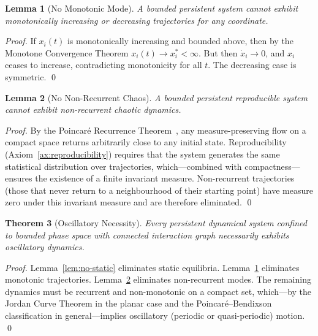 \documentclass[11pt,twocolumn,a4paper]{article}
\newtheorem{theorem}{Theorem}[section]
\newtheorem{lemma}[theorem]{Lemma}
\begin{document}
\begin{lemma}[No Monotonic Mode]
\label{lem:no-monotonic}
A bounded persistent system cannot exhibit monotonically increasing or
decreasing trajectories for any coordinate.
\end{lemma}

\begin{proof}
If $x_i(t)$ is monotonically increasing and bounded above, then by
the Monotone Convergence Theorem $x_i(t) \to x_i^* < \infty$.  But
then $\dot{x}_i \to 0$, and $x_i$ ceases to increase, contradicting
monotonicity for all $t$.  The decreasing case is symmetric.  \qed
\end{proof}

\begin{lemma}[No Non-Recurrent Chaos]
\label{lem:no-chaos}
A bounded persistent reproducible system cannot exhibit
non-recurrent chaotic dynamics.
\end{lemma}

\begin{proof}
By the Poincar\'{e} Recurrence Theorem~\citep{poincare1890,katok1995},
any measure-preserving flow on a compact space returns arbitrarily
close to any initial state.  Reproducibility (Axiom~\ref{ax:reproducibility})
requires that the system generates the same statistical distribution
over trajectories, which---combined with compactness---ensures the
existence of a finite invariant measure.  Non-recurrent trajectories
(those that never return to a neighbourhood of their starting point)
have measure zero under this invariant measure and are therefore
eliminated.  \qed
\end{proof}

\begin{theorem}[Oscillatory Necessity]
\label{thm:oscillatory-necessity}
Every persistent dynamical system confined to bounded phase space with
connected interaction graph necessarily exhibits oscillatory dynamics.
\end{theorem}

\begin{proof}
Lemma~\ref{lem:no-static} eliminates static equilibria.
Lemma~\ref{lem:no-monotonic} eliminates monotonic trajectories.
Lemma~\ref{lem:no-chaos} eliminates non-recurrent modes.  The
remaining dynamics must be recurrent and non-monotonic on a compact
set, which---by the Jordan Curve Theorem in the planar case and the
Poincar\'{e}--Bendixson classification in general---implies
oscillatory (periodic or quasi-periodic) motion.  \qed
\end{proof}
\end{document}
